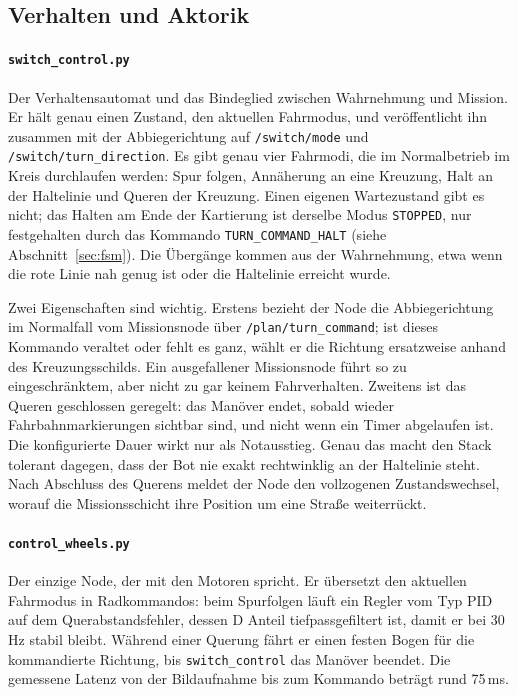 \documentclass[10pt,a4paper]{article}
\begin{document}
\subsection{Verhalten und Aktorik}

\paragraph{\texttt{switch\_control.py}} Der Verhaltensautomat und das
Bindeglied zwischen Wahrnehmung und Mission. Er hält genau einen Zustand, den
aktuellen Fahrmodus, und veröffentlicht ihn zusammen mit der Abbiegerichtung
auf \texttt{/switch/mode} und \texttt{/switch/turn\_direction}. Es gibt genau
vier Fahrmodi, die im Normalbetrieb im Kreis durchlaufen werden: Spur folgen,
Annäherung an eine Kreuzung, Halt an der Haltelinie und Queren der Kreuzung.
Einen eigenen Wartezustand gibt es nicht; das Halten am Ende der Kartierung ist
derselbe Modus \texttt{STOPPED}, nur festgehalten durch das Kommando
\texttt{TURN\_COMMAND\_HALT} (siehe Abschnitt~\ref{sec:fsm}). Die Übergänge
kommen aus der Wahrnehmung, etwa wenn die rote Linie nah genug ist oder die
Haltelinie erreicht wurde.

Zwei Eigenschaften sind wichtig. Erstens bezieht der Node die Abbiegerichtung
im Normalfall vom Missionsnode über \texttt{/plan/turn\_command}; ist dieses
Kommando veraltet oder fehlt es ganz, wählt er die Richtung ersatzweise anhand
des Kreuzungsschilds. Ein ausgefallener Missionsnode führt so zu
eingeschränktem, aber nicht zu gar keinem Fahrverhalten. Zweitens ist das
Queren geschlossen geregelt: das Manöver endet, sobald wieder
Fahrbahnmarkierungen sichtbar sind, und nicht wenn ein Timer abgelaufen ist.
Die konfigurierte Dauer wirkt nur als Notausstieg. Genau das macht den Stack
tolerant dagegen, dass der Bot nie exakt rechtwinklig an der Haltelinie steht.
Nach Abschluss des Querens meldet der Node den vollzogenen Zustandswechsel,
worauf die Missionsschicht ihre Position um eine Straße weiterrückt.

\paragraph{\texttt{control\_wheels.py}} Der einzige Node, der mit den Motoren
spricht. Er übersetzt den aktuellen Fahrmodus in Radkommandos: beim Spurfolgen
läuft ein Regler vom Typ PID auf dem Querabstandsfehler, dessen D Anteil
tiefpassgefiltert ist, damit er bei 30\,Hz stabil bleibt. Während einer Querung
fährt er einen festen Bogen für die kommandierte Richtung, bis
\texttt{switch\_control} das Manöver beendet. Die gemessene Latenz von der
Bildaufnahme bis zum Kommando beträgt rund 75\,ms.
\end{document}
